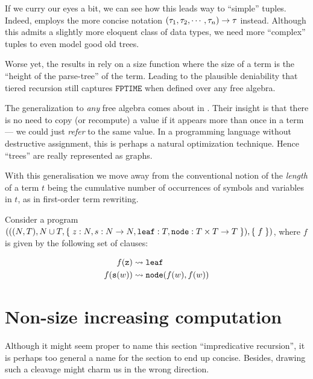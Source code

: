 If we curry our eyes a bit, we can see how this leads way to ``simple'' tuples.
Indeed, \cite{marion-2003} employs the more concise notation
${\mathopen{}\left({\tau_1,\tau_2,\cdots,\tau_n}\right)\mathclose{}}\rightarrow \tau$ instead.  Although this
admits a slightly more eloquent class of data types, we need more ``complex''
tuples to even model good old trees.

Worse yet, the results in \cite{leivant-1995} rely on a size function where the
size of a term is the ``height of the parse-tree'' of the term. Leading to the
plausible deniability that tiered recursion still captures $\mathtt{FPTIME}$
when defined over any free algebra\cite{caseiro-1996}.

The generalization to \emph{any} free algebra comes about in
\cite{dal-lago-et-al-2010}. Their insight is that there is no need to copy (or
recompute) a value if it appears more than once in a term --- we could just
\emph{refer} to the same value. In a programming language without destructive
assignment, this is perhaps a natural optimization technique. Hence ``trees''
are really represented as graphs.

\begin{remark} With this generalisation we move away from the conventional
notion of the \emph{length} of a term $t$ being the cumulative number of
occurrences of symbols and variables in $t$, as in first-order term
rewriting\cite{klop-vrijer-2003}. \end{remark}

\begin{example} \cite{dal-lago-et-al-2003} Consider a program ${\mathopen{}\left({{\mathopen{}\left({{\mathopen{}\left({N,T}\right)\mathclose{}}, N
\cup T, \mathopen{}\left\{\mathrel{}{z : N, s : N \rightarrow N, \mathtt{leaf} : T, \mathtt{node} : T
\times T \rightarrow T}\mathrel{}\right\}\mathclose{}}\right)\mathclose{}}, \mathopen{}\left\{\mathrel{}{f}\mathrel{}\right\}\mathclose{}}\right)\mathclose{}}$, where $f$ is given by the following set of
clauses:

\begin{align}
f{\mathopen{}\left({\mathtt{z}}\right)\mathclose{}}       &\leadsto \mathtt{leaf} \\
f{\mathopen{}\left({\mathtt{s}{\mathopen{}\left({w}\right)\mathclose{}}}\right)\mathclose{}}  &\leadsto \mathtt{node}{\mathopen{}\left({f{\mathopen{}\left({w}\right)\mathclose{}}, f{\mathopen{}\left({w}\right)\mathclose{}}}\right)\mathclose{}}
\end{align}

\end{example}

\section{Non-size increasing computation}

Although it might seem proper to name this section ``impredicative recursion'',
it is perhaps too general a name for the section to end up concise. Besides,
drawing such a cleavage might charm us in the wrong direction.


